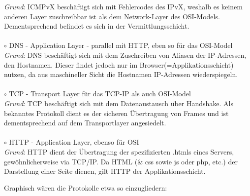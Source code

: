 \documentclass[11pt]{article}
\begin{document}
\begin{enumerate}[\thesection .1]
\begin{addmargin}[1em]{1em}
            \emph{Grund}: ICMPvX beschäftigt sich mit Fehlercodes des IPvX, weshalb es keinem anderen Layer zuschreibbar ist als dem Network-Layer des OSI-Models.
            Dementsprechend befindet es sich in der Vermittlungsschicht.\\\\
            $\circ$ DNS - Application Layer - parallel mit HTTP, eben so für das OSI-Model\\
            \emph{Grund}: DNS beschäftigt sich mit dem Zuschreiben von Aliasen der IP-Adressen, den Hostnamen.
            Dieser findet jedoch nur im Browser(=Applikationsschicht) nutzen, da aus maschineller Sicht die Hostnamen IP-Adressen wiederspiegeln.\\\\
            $\circ$ TCP - Transport Layer für das TCP-IP als auch OSI-Model\\
            \emph{Grund}: TCP beschäftigt sich mit dem Datenaustausch über Handshake. Als bekanntes Protokoll dient es der sicheren Übertragung von Frames
            und ist dementsprechend auf dem Transportlayer angesiedelt.\\\\
            $\circ$ HTTP - Application Layer, ebenso für OSI\\
            \emph{Grund}: HTTP dient der Übertragung der spezifizierten .htmls eines Servers, gewöhnlicherweise via TCP/IP.
            Da HTML (\& css sowie js oder php, etc.) der Darstellung einer Seite dienen, gilt HTTP der Applikationsschicht.
        \end{addmargin}
\pagebreak
        Graphisch wären die Protokolle etwa so einzugliedern:\\
        \noindent{}




    \end{enumerate}
\end{document}
